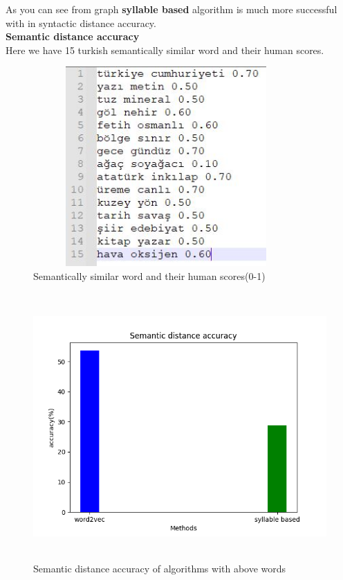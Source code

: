 \documentclass{article}
\begin{document}
As you can see from graph \textbf{syllable based} algorithm is much more successful with in syntactic distance accuracy. \\
\newline
\textbf{Semantic distance accuracy} \\
\newline
Here we have 15 turkish semantically  similar word and their human scores.
\begin{figure}[H]
    \centering
	\includegraphics[width=4in, height=3in]{17.JPG}
	\caption[Optional caption]{Semantically similar word and their human scores(0-1)}
	\label{}
\end{figure}
\begin{figure}[H]
    \centering
	\includegraphics[width=6in, height=4in]{seman_dist.png}
	\caption[Optional caption]{Semantic distance accuracy of algorithms with above words}
	\label{}
\end{figure}
\end{document}
